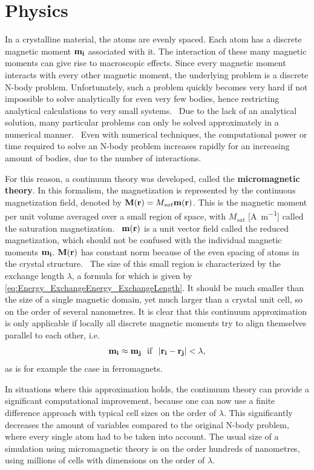 \documentclass[11pt,a4paper,english]{article}
\begin{document}
\section{Physics}
In a crystalline material, the atoms are evenly spaced. Each atom has a discrete magnetic moment $\vb{m_i}$ associated with it. The interaction of these many magnetic moments can give rise to macroscopic effects. Since every magnetic moment interacts with every other magnetic moment, the underlying problem is a discrete N-body problem. Unfortunately, such a problem quickly becomes very hard if not impossible to solve analytically for even very few bodies, hence restricting analytical calculations to very small systems.~\cite{abert2013discrete} Due to the lack of an analytical solution, many particular problems can only be solved approximately in a numerical manner.~\cite{abert2013discrete} Even with numerical techniques, the computational power or time required to solve an N-body problem increases rapidly for an increasing amount of bodies, due to the number of interactions. \par
For this reason, a continuum theory was developed, called the \textbf{micromagnetic theory}. In this formalism, the magnetization is represented by the continuous magnetization field, denoted by $\vb{M}(\vb{r}) = M_{sat} \vb{m}(\vb{r})$. This is the magnetic moment per unit volume averaged over a small region of space, with $M_{sat}$ [\si{\ampere\per\metre}] called the saturation magnetization.~\cite{Gilbert1956} $\vb{m}(\vb{r})$ is a unit vector field called the reduced magnetization, which should not be confused with the individual magnetic moments $\vb{m_i}$. $\vb{M}(\vb{r})$ has constant norm because of the even spacing of atoms in the crystal structure.~\cite{abert2013discrete}
The size of this small region is characterized by the exchange length $\lambda$, a formula for which is given by \cref{eq:Energy_ExchangeEnergy_ExchangeLength}. It should be much smaller than the size of a single magnetic domain, yet much larger than a crystal unit cell, so on the order of several nanometres. It is clear that this continuum approximation is only applicable if locally all discrete magnetic moments try to align themselves parallel to each other, i.e.
\begin{equation}
    \vb{m_i} \approx \vb{m_j}~~\mathrm{if}~~\abs{\vb{r_i} - \vb{r_j}} < \lambda \mathrm{,}
\end{equation}
as is for example the case in ferromagnets.~\cite{abert2013discrete} \par
In situations where this approximation holds, the continuum theory can provide a significant computational improvement, because one can now use a finite difference approach with typical cell sizes on the order of $\lambda$. This significantly decreases the amount of variables compared to the original N-body problem, where every single atom had to be taken into account. The usual size of a simulation using micromagnetic theory is on the order hundreds of nanometres, using millions of cells with dimensions on the order of $\lambda$.~\cite{abert2013discrete} \par
\end{document}
